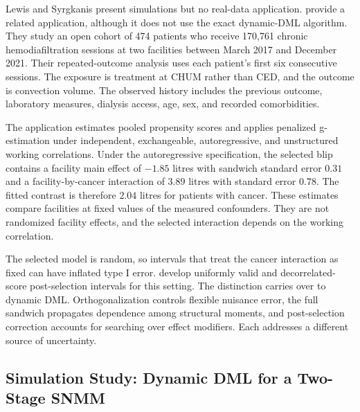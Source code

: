 Lewis and Syrgkanis present simulations but no real-data application. \citet{jaman2025penalizedg} provide a related application, although it does not use the exact dynamic-DML algorithm. They study an open cohort of 474 patients who receive 170,761 chronic hemodiafiltration sessions at two facilities between March 2017 and December 2021. Their repeated-outcome analysis uses each patient's first six consecutive sessions. The exposure is treatment at CHUM rather than CED, and the outcome is convection volume. The observed history includes the previous outcome, laboratory measures, dialysis access, age, sex, and recorded comorbidities.

The application estimates pooled propensity scores and applies penalized g-estimation under independent, exchangeable, autoregressive, and unstructured working correlations. Under the autoregressive specification, the selected blip contains a facility main effect of $-1.85$ litres with sandwich standard error $0.31$ and a facility-by-cancer interaction of $3.89$ litres with standard error $0.78$. The fitted contrast is therefore $2.04$ litres for patients with cancer. These estimates compare facilities at fixed values of the measured confounders. They are not randomized facility effects, and the selected interaction depends on the working correlation.

The selected model is random, so intervals that treat the cancer interaction as fixed can have inflated type I error. \citet{jaman2025postselectiong} develop uniformly valid and decorrelated-score post-selection intervals for this setting. The distinction carries over to dynamic DML. Orthogonalization controls flexible nuisance error, the full sandwich propagates dependence among structural moments, and post-selection correction accounts for searching over effect modifiers. Each addresses a different source of uncertainty.

\subsection{Simulation Study: Dynamic DML for a Two-Stage SNMM}
\label{subsec:sim_dynamic_dml}

